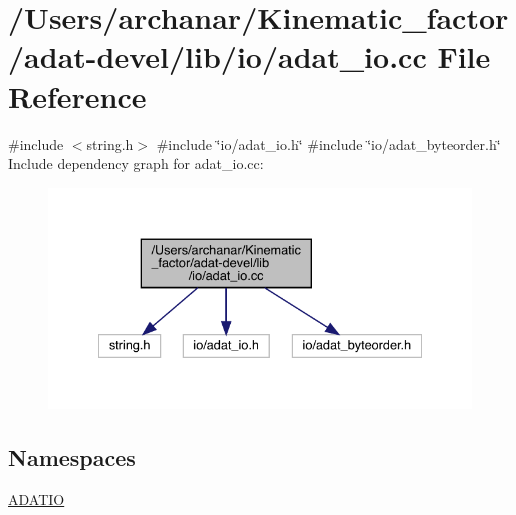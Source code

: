 \hypertarget{adat-devel_2lib_2io_2adat__io_8cc}{}\section{/\+Users/archanar/\+Kinematic\+\_\+factor/adat-\/devel/lib/io/adat\+\_\+io.cc File Reference}
\label{adat-devel_2lib_2io_2adat__io_8cc}
{\ttfamily \#include $<$string.\+h$>$}\newline
{\ttfamily \#include \char`\"{}io/adat\+\_\+io.\+h\char`\"{}}\newline
{\ttfamily \#include \char`\"{}io/adat\+\_\+byteorder.\+h\char`\"{}}\newline
Include dependency graph for adat\+\_\+io.\+cc\+:
\nopagebreak
\begin{figure}[H]
\begin{center}
\leavevmode
\includegraphics[width=334pt]{d7/d5c/adat-devel_2lib_2io_2adat__io_8cc__incl}
\end{center}
\end{figure}
\subsection*{Namespaces}
\begin{DoxyCompactItemize}
\item 
 \mbox{\hyperlink{namespaceADATIO}{A\+D\+A\+T\+IO}}
\end{DoxyCompactItemize}
